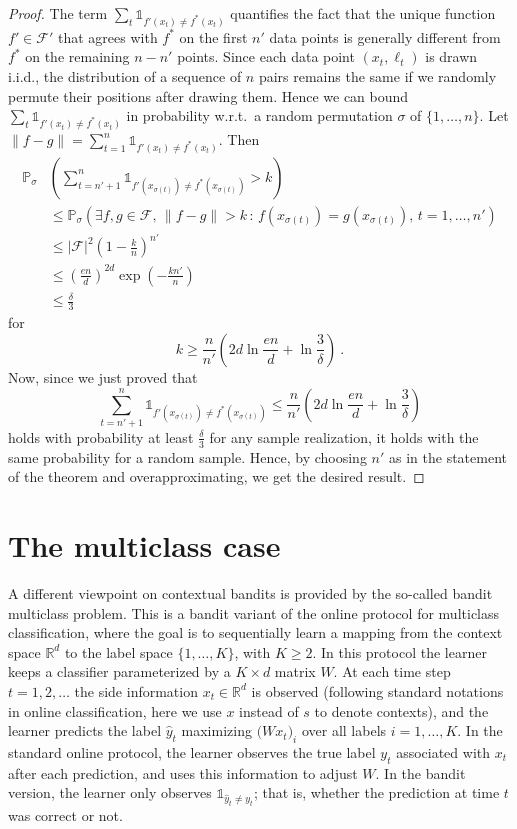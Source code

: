 \documentclass[11pt]{hackednow}
\renewcommand{\P}{\mathbb{P}}
\newcommand{\R}{\mathbb{R}}
\newcommand{\cF}{\mathcal{F}}
\def\ds1{\mathds{1}}
\newcommand{\wh}{\widehat}
\newcommand{\norm}[1]{\left\|{#1}\right\|}
\newcommand{\yhat}{\wh{y}}
\begin{document}
\begin{proof}
The term $\sum_t \ds1_{f'(x_t) \neq f^*(x_t)}$ quantifies the fact that the unique function $f'\in\cF'$ that agrees with $f^*$ on the first $n'$ data points is generally different from $f^*$ on the remaining $n-n'$ points. Since each data point $(x_t,\ell_t)$ is drawn i.i.d., the distribution of a sequence of $n$ pairs remains the same if we randomly permute their positions after drawing them. Hence we can bound
$
    \sum_t \ds1_{f'(x_t) \neq f^*(x_t)}
$
in probability w.r.t.\ a random permutation $\sigma$ of $\{1,\dots,n\}$. Let $\norm{f-g} = \sum_{t=1}^n \ds1_{f'(x_t) \neq f^*(x_t)}$. Then
\begin{align*}
    \P_\sigma&\left(\sum_{t=n'+1}^n \ds1_{f'(x_{\sigma(t)}) \neq f^*(x_{\sigma(t)})} > k\right)
\\ &\le
    \P_\sigma\left( \exists f,g \in \cF,\, \norm{f-g} > k \,:\,  f(x_{\sigma(t)})=g(x_{\sigma(t)}),\, t=1,\dots,n' \right)
\\ &\le
    |\cF|^2 \left(1-\frac{k}{n}\right)^{n'}
\\ &\le
    \left(\frac{en}{d}\right)^{2d} \exp\left(-\frac{kn'}{n}\right)
\\ &\le
    \frac{\delta}{3}
\end{align*}
for
\[
    k \ge \frac{n}{n'}\left(2d\ln\frac{en}{d} + \ln\frac{3}{\delta}\right)~.
\]
Now, since we just proved that
\[
    \sum_{t=n'+1}^n \ds1_{f'(x_{\sigma(t)}) \neq f^*(x_{\sigma(t)})}
\le
    \frac{n}{n'}\left(2d\ln\frac{en}{d} + \ln\frac{3}{\delta}\right)
\]
holds with probability at least $\tfrac{\delta}{3}$ for any sample realization, it holds with the same probability for a random sample. Hence, by choosing $n'$ as in the statement of the theorem and overapproximating, we get the desired result.
\end{proof}


\section{The multiclass case}
\label{s:multiclass}
%
A different viewpoint on contextual bandits is provided by the so-called bandit multiclass problem. This is a bandit variant of the online protocol for multiclass classification, where the goal is to sequentially learn a mapping from the context space $\R^d$ to the label space $\{1,\dots,K\}$, with $K \ge 2$. In this protocol the learner keeps a classifier parameterized by a $K \times d$ matrix $W$. At each time step $t=1,2,\dots$ the side information $x_t\in\R^d$ is observed (following standard notations in online classification, here we use $x$ instead of $s$ to denote contexts), and the learner predicts the label $\yhat_t$ maximizing $\bigl(Wx_t\bigr)_i$ over all labels $i=1,\dots,K$. In the standard online protocol, the learner observes the true label $y_t$ associated with $x_t$ after each prediction, and uses this information to adjust $W$. In the bandit version, the learner only observes $\ds1_{\yhat_t \neq y_t}$; that is, whether the prediction at time $t$ was correct or not.
\end{document}
